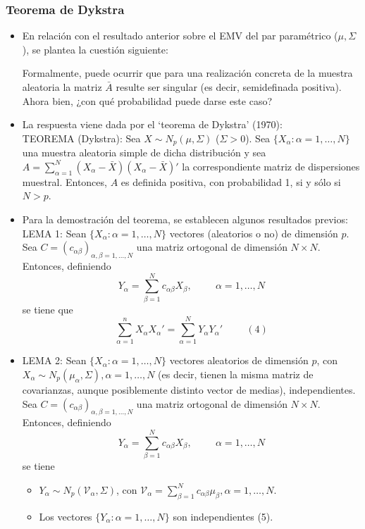 \documentclass[11pt,a4paper]{article}
\begin{document}
\subsubsection{Teorema de Dykstra}
\begin{itemize}
\item En relación con el resultado anterior sobre el EMV del par paramétrico ($\mu, \Sigma$), se plantea la cuestión siguiente:

Formalmente, puede ocurrir que para una realización concreta de la muestra aleatoria la matriz $\bar{A}$ resulte ser singular (es decir, semidefinada positiva). Ahora bien, ¿con qué probabilidad puede darse este caso?

\item La respuesta viene dada por el `teorema de Dykstra' (1970): \\
TEOREMA (Dykstra): Sea $X \sim N_{p}(\mu, \Sigma)$ ($\Sigma > 0$). Sea $\{X_{\alpha}: \alpha=1,\dots,N\}$ una muestra aleatoria simple de dicha distribución y sea $A = \sum_{\alpha=1}^{N}(X_{\alpha} - \bar{X})(X_{\alpha}-\bar{X})'$ la correspondiente matriz de dispersiones muestral. Entonces, $A$ es definida positiva, con probabilidad 1, si y sólo si $N > p$.

\item Para la demostración del teorema, se establecen algunos resultados previos: \\
LEMA 1: Sean $\{X_{\alpha}: \alpha=1,\dots,N\}$ vectores (aleatorios o no) de dimensión $p$. Sea $C = (c_{\alpha\beta})_{\alpha,\beta=1,\dots,N}$ una matriz ortogonal de dimensión $N \times N$. Entonces, definiendo
$$Y_{\alpha} = \sum_{\beta=1}^{N} c_{\alpha\beta}X_{\beta}, \hspace{1cm} \alpha=1,\dots,N$$
se tiene que
$$\sum_{\alpha=1}^{n}X_{\alpha}X_{\alpha}' = \sum_{\alpha=1}^{N}Y_{\alpha}Y_{\alpha}' \hspace{1cm} (4)$$

\item LEMA 2: Sean $\{X_{\alpha}: \alpha=1,\dots,N\}$ vectores aleatorios de dimensión $p$, con $X_{\alpha} \sim N_{p}(\mu_{\alpha}, \Sigma), \alpha = 1,\dots,N$ (es decir, tienen la misma matriz de covarianzas, aunque posiblemente distinto vector de medias), independientes. Sea $C = (c_{\alpha\beta})_{\alpha, \beta = 1,\dots,N}$ una matriz ortogonal de dimensión $N \times N$. Entonces, definiendo
$$Y_{\alpha} = \sum_{\beta=1}^{N} c_{\alpha\beta}X_{\beta}, \hspace{1cm} \alpha=1,\dots,N$$
se tiene
\begin{itemize}
\item $Y_{\alpha} \sim N_{p}(\mathcal{V}_{\alpha}, \Sigma)$, con $\mathcal{V}_{\alpha} = \sum_{\beta=1}^{N}c_{\alpha\beta}\mu_{\beta}, \alpha = 1, \dots, N$.
\item Los vectores $\{Y_{\alpha}: \alpha=1,\dots,N\}$ son independientes (5).
\end{itemize}


\end{itemize}
\end{document}
